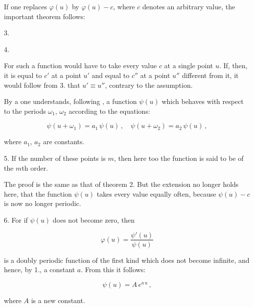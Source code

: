 
If one replaces $\varphi(u)$ by $\varphi(u)-c$, where $c$ denotes an
arbitrary value, the important theorem follows:

3. 

4. 

For such a function would have to take every value $c$ at a single
point $u$. If, then, it is equal to $c'$ at a point $u'$
and equal to $c''$ at a point $u''$ different from it, it would
follow from 3. that $u'\equiv u''$, contrary to the assumption.

By a  one understands, following , a function $\psi(u)$ which
behaves with respect to the periods $\omega_1$, $\omega_2$ according to the equations:

\[ \psi(u+\omega_1) = a_1\,\psi(u)\,, \quad \psi(u+\omega_2) = a_2\,\psi(u)\,, \]

where $a_1$, $a_2$ are constants.

5.  If the number of these points is $m$, then here too the
function is said to be of the $m$th order.

The proof is the same as that of theorem 2. But the
extension no longer holds here, that the function $\psi(u)$ takes every
value equally often, because $\psi(u)-c$ is now no longer
 periodic.

6.  For if $\psi(u)$
does not become zero, then

\[ \varphi(u) = \dfrac{\psi'(u)}{\psi(u)} \]

is a doubly periodic function of the first kind which does not
become infinite, and hence, by 1., a constant $a$. From this it follows:

\[ \psi(u) = A\,e^{a\,u}\,, \]

where $A$ is a new constant.
